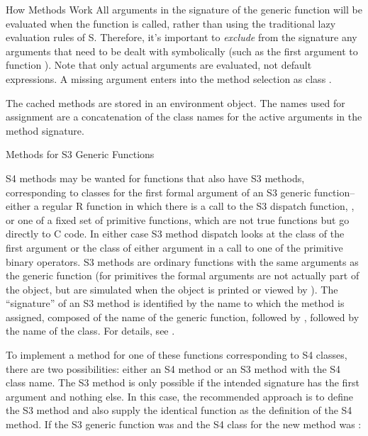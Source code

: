 \begin{Section}{How Methods Work}
All arguments in the signature of the generic function will be evaluated when the
function is called, rather than using the traditional lazy
evaluation rules of S.  Therefore, it's important to \emph{exclude}
from the signature any arguments that need to be dealt with
symbolically (such as the first argument to function
).  Note that only actual arguments are
evaluated, not default expressions.
A missing argument enters into the method selection as class
.

The cached methods are stored in an
environment object.  The names used for assignment are a
concatenation of the class names for the active arguments in the method signature.

\end{Section}
%
\begin{Section}{Methods for S3 Generic Functions}

S4 methods may be wanted for functions that also have S3 methods, corresponding to classes for the first
formal argument of an S3 generic function--either a regular R function in which there is a
call to the S3 dispatch function, ,
or one of a fixed set of primitive
functions, which are not true functions but go directly to C code.
In either case S3 method dispatch looks at the class of the first
argument or the class of either
argument in a call to one of the primitive binary operators.
S3 methods are ordinary functions with the same arguments as the
generic function (for primitives the formal arguments are not actually
part of the object, but are simulated when the object is printed or
viewed by ).
The ``signature'' of an S3 method is identified  by the name to
which the method is assigned, composed of the name of the
generic function, followed by , followed by the name of the class.
For details, see .

To implement a method for one of these functions corresponding to S4
classes, there are two possibilities: either an S4 method or an S3 method with the
S4 class name.
The S3 method is only possible if the intended signature has the
first argument and nothing else.
In this case,
the recommended approach is to define the S3 method and also supply the
identical function as the definition of the S4 method.
If the S3 generic function was  and the S4 class for
the new method was 
:



\end{Section}
